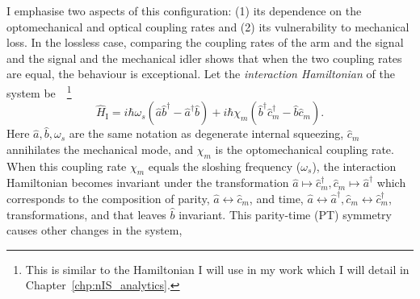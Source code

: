 I emphasise two aspects of this configuration: (1) its dependence on the optomechanical and optical coupling rates and (2) its vulnerability to mechanical loss. %
In the lossless case, comparing the coupling rates of the arm and the signal and the signal and the mechanical idler shows that when the two coupling rates are equal, the behaviour is exceptional.
Let the \emph{interaction Hamiltonian} of the system be~\cite{}~\footnote{This is similar to the Hamiltonian I will use in my work which I will detail in Chapter~\ref{chp:nIS_analytics}.}
\begin{equation}\label{eq:sWLC_HI}
\hat{H}_\text{I}=i\hbar\omega_s(\hat{a}\hat{b}^\dag-\hat{a}^\dag\hat{b})+i\hbar\chi_m(\hat{b}^\dag\hat{c}_m^\dag-\hat{b}\hat{c}_m).
\end{equation}
Here $\hat a, \hat b, \omega_s$ are the same notation as degenerate internal squeezing, $\hat{c}_m$ annihilates the mechanical mode, and $\chi_m$ is the optomechanical coupling rate. When this coupling rate $\chi_m$ equals the sloshing frequency ($\omega_s$), the interaction Hamiltonian becomes invariant under the transformation $\hat a\mapsto\hat{c}_m^\dag, \hat{c}_m\mapsto\hat a^\dag$ which corresponds to the composition of parity, $\hat a\leftrightarrow \hat{c}_m$, and time, $\hat a\leftrightarrow \hat a^\dag,\hat {c}_m\leftrightarrow \hat {c}_m^\dag$, transformations, and that leaves $\hat b$ invariant. This parity-time (PT) symmetry causes other changes in the system, 
